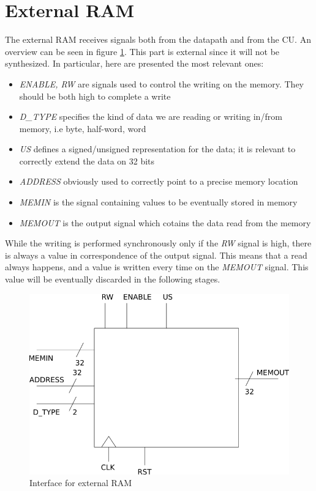 \section{External RAM}
\label{ram}
The external RAM receives signals both from the datapath and from the CU. An overview can be seen in figure \ref{ext_ram_fig}. This part is external since it will not be synthesized. In particular, here are presented the most relevant ones:
\begin{itemize}
	\item \textit{ENABLE, RW} are signals used to control the writing on the memory. They should be both high to complete a write
	\item \textit{D\_TYPE} specifies the kind of data we are reading or writing in/from memory, i.e byte, half-word, word
	\item \textit{US} defines a signed/unsigned representation for the data; it is relevant to correctly extend the data on 32 bits
	\item \textit{ADDRESS} obviously used to correctly point to a precise memory location
	\item \textit{MEMIN} is the signal containing values to be eventually stored in memory
	\item \textit{MEMOUT} is the output signal which cotains the data read from the memory
\end{itemize}

While the writing is performed synchronously only if the \textit{RW} signal is high, there is always a value in correspondence of the output signal. This means that a read always happens, and a value is written every time on the \textit{MEMOUT} signal. This value will be eventually discarded in the following stages.

\begin{figure}
	\centering
	\includegraphics[scale=0.5]{chapters/figures/ram_ext}
	\caption{Interface for external RAM}
	\label{ext_ram_fig}
\end{figure} 
